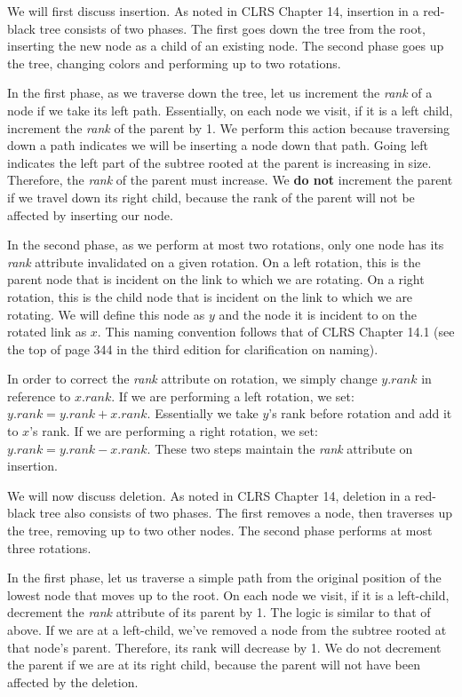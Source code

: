 \documentclass[11pt]{article}
\begin{document}
We will first discuss insertion. As noted in CLRS Chapter 14, insertion in a red-black tree consists of two phases. The first goes down the tree from the root, inserting the new node as a child of an existing node. The second phase goes up the tree, changing colors and performing up to two rotations.

In the first phase, as we traverse down the tree, let us increment the \textit{rank} of a node if we take its left path. Essentially, on each node we visit, if it is a left child, increment the \textit{rank} of the parent by 1. We perform this action because traversing down a path indicates we will be inserting a node down that path. Going left indicates the left part of the subtree rooted at the parent is increasing in size. Therefore, the \textit{rank} of the parent must increase. We \textbf{do not} increment the parent if we travel down its right child, because the rank of the parent will not be affected by inserting our node.

In the second phase, as we perform at most two rotations, only one node has its \textit{rank} attribute invalidated on a given rotation. On a left rotation, this is the parent node that is incident on the link to which we are rotating. On a right rotation, this is the child node that is incident on the link to which we are rotating. We will define this node as $y$ and the node it is incident to on the rotated link as $x$. This naming convention follows that of CLRS Chapter 14.1 (see the top of page 344 in the third edition for clarification on naming).

In order to correct the \textit{rank} attribute on rotation, we simply change $y.rank$ in reference to $x.rank$. If we are performing a left rotation, we set: $y.rank = y.rank + x.rank$. Essentially we take $y$'s rank before rotation and add it to $x$'s rank. If we are performing a right rotation, we set: $y.rank = y.rank - x.rank$. These two steps maintain the \textit{rank} attribute on insertion.

We will now discuss deletion. As noted in CLRS Chapter 14, deletion in a red-black tree also consists of two phases. The first removes a node, then traverses up the tree, removing up to two other nodes. The second phase performs at most three rotations.

In the first phase, let us traverse a simple path from the original position of the lowest node that moves up to the root. On each node we visit, if it is a left-child, decrement the \textit{rank} attribute of its parent by 1. The logic is similar to that of above. If we are at a left-child, we've removed a node from the subtree rooted at that node's parent. Therefore, its rank will decrease by 1. We do not decrement the parent if we are at its right child, because the parent will not have been affected by the deletion.
\end{document}
